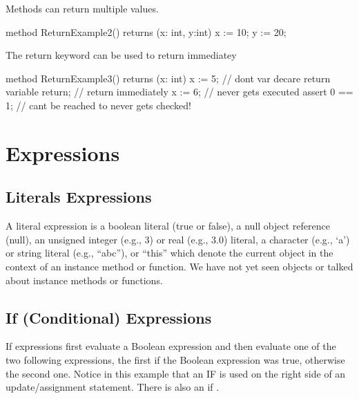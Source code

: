 \documentclass[letterpaper,10pt,english]{sphinxmanual}
\begin{document}
Methods can return multiple values.

\begin{sphinxVerbatim}[commandchars=\\\{\}]
method ReturnExample2() returns (x: int, y:int)
\PYGZob{}
    x := 10;
    y := 20;
\PYGZcb{}
\end{sphinxVerbatim}

The return keyword can be used to return immediatey

\begin{sphinxVerbatim}[commandchars=\\\{\}]
method ReturnExample3() returns (x: int)
\PYGZob{}
    x := 5;     // don\PYGZsq{}t \PYGZdq{}var\PYGZdq{} decare return variable
    return;     // return immediately
    x := 6;     // never gets executed
    assert 0 == 1; // can\PYGZsq{}t be reached to never gets checked!
\PYGZcb{}
\end{sphinxVerbatim}


\section{Expressions}
\label{\detokenize{06-dafny-language:expressions}}

\subsection{Literals Expressions}
\label{\detokenize{06-dafny-language:literals-expressions}}
A literal expression is a boolean literal (true or false), a null
object reference (null), an unsigned integer (e.g., 3) or real (e.g.,
3.0) literal, a character (e.g., ‘a’) or string literal (e.g., “abc”),
or “this” which denote the current object in the context of an
instance method or function. We have not yet seen objects or talked
about instance methods or functions.


\subsection{If (Conditional) Expressions}
\label{\detokenize{06-dafny-language:if-conditional-expressions}}
If expressions first evaluate a Boolean expression and then evaluate
one of the two following expressions, the first if the Boolean
expression was true, otherwise the second one.  Notice in this example
that an IF  is used on the right side of an
update/assignment statement. There is also an if .
\end{document}
